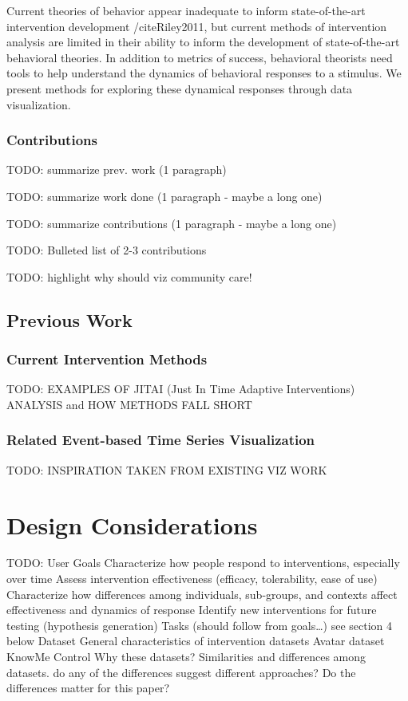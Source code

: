 \documentclass[review,journal]{vgtc}         %
\begin{document}
Current theories of behavior appear inadequate to inform state-of-the-art intervention development /cite{Riley2011}, but current methods of intervention analysis are limited in their ability to inform the development of state-of-the-art behavioral theories.
In addition to metrics of success, behavioral theorists need tools to help understand the dynamics of behavioral responses to a stimulus.
We present methods for exploring these dynamical responses through data visualization.

\subsubsection{Contributions}
TODO: summarize prev. work (1 paragraph)

TODO: summarize work done (1 paragraph - maybe a long one)

TODO: summarize contributions (1 paragraph - maybe a long one)

TODO: Bulleted list of 2-3 contributions

TODO: highlight why should viz community care!

\subsection{Previous Work}
\subsubsection{Current Intervention Methods}
TODO: EXAMPLES OF JITAI (Just In Time Adaptive Interventions) ANALYSIS and HOW METHODS FALL SHORT

\subsubsection{Related Event-based Time Series Visualization}
TODO: INSPIRATION TAKEN FROM EXISTING VIZ WORK


\section{Design Considerations}
TODO:
User Goals
Characterize how people respond to interventions, especially over time
Assess intervention effectiveness (efficacy, tolerability, ease of use)
Characterize how differences among individuals, sub-groups, and contexts affect effectiveness and dynamics of response
Identify new interventions for future testing (hypothesis generation)
Tasks (should follow from goals…)
see section 4 below
Dataset
General characteristics of intervention datasets
Avatar dataset
KnowMe
Control
Why these datasets?
Similarities and differences among datasets.
do any of the differences suggest different approaches?  Do the differences matter for this paper?
\end{document}
